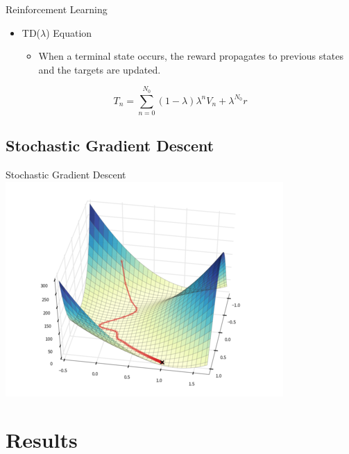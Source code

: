 \begin{frame}{Reinforcement Learning}
\begin{itemize}
\item TD($\lambda$) Equation
\begin{itemize}
\item When a terminal state occurs, the reward propagates to previous states and the targets are updated.
\end{itemize}
\end{itemize}
\begin{equation*}
T_n = \sum_{n=0}^{N_0} (1-\lambda)\lambda^n V_n + \lambda^{N_0} r
\end{equation*}
\end{frame}
\subsection{Stochastic Gradient Descent}

\begin{frame}{Stochastic Gradient Descent}
\includegraphics[width = 0.8 \textwidth]{sgd}\centering
\end{frame}

\section{Results}
\subsection{}

